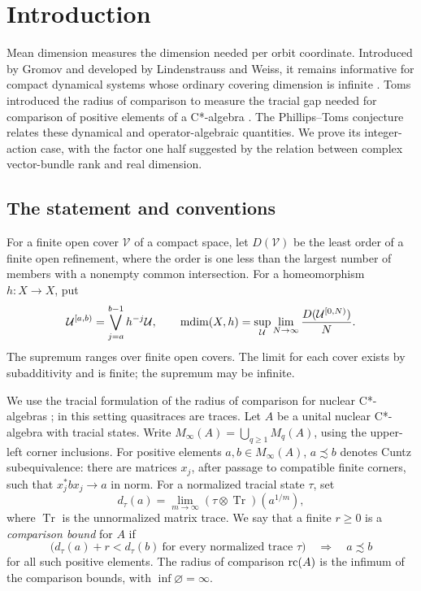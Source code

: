 \section{Introduction}
\label{sec:introduction}

Mean dimension measures the dimension needed per orbit coordinate.
Introduced by Gromov and developed by Lindenstrauss and Weiss, it remains
informative for compact dynamical systems whose ordinary covering
dimension is infinite \cite{Gromov1999,LindenstraussWeiss2000}.
Toms introduced the radius of comparison to measure the tracial gap
needed for comparison of positive elements of a C*-algebra
\cite[Definition~6.1]{Toms2006}. The Phillips--Toms conjecture relates
these dynamical and operator-algebraic quantities. We prove its
integer-action case, with the factor one half suggested by the relation
between complex vector-bundle rank and real dimension.

\subsection{The statement and conventions}

For a finite open cover \(\mathcal V\) of a compact space, let
\(D(\mathcal V)\) be the least order of a finite open refinement, where
the order is one less than the largest number of members with a nonempty
common intersection. For a homeomorphism \(h:X\to X\), put
\[
\mathcal U^{[a,b)}=\bigvee_{j=a}^{b-1}h^{-j}\mathcal U,
\qquad
\operatorname{mdim}(X,h)=\sup_{\mathcal U}
\lim_{N\to\infty}\frac{D(\mathcal U^{[0,N)})}{N}.
\]
The supremum ranges over finite open covers. The limit for each cover
exists by subadditivity and is finite; the supremum may be infinite.

We use the tracial formulation of the radius of comparison for nuclear
C*-algebras \cite[Definition~2.10]{Niu2024}; in this setting quasitraces
are traces. Let \(A\) be a unital nuclear C*-algebra with tracial states. Write
\(M_\infty(A)=\bigcup_{q\ge1}M_q(A)\), using the upper-left corner
inclusions. For positive elements \(a,b\in M_\infty(A)\),
\(a\precsim b\) denotes Cuntz subequivalence: there are matrices
\(x_j\), after passage to compatible finite corners, such that
\(x_j^*bx_j\to a\) in norm. For a normalized tracial state \(\tau\), set
\[
d_\tau(a)=\lim_{m\to\infty}(\tau\otimes\operatorname{Tr})(a^{1/m}),
\]
where \(\operatorname{Tr}\) is the unnormalized matrix trace.
We say that a finite \(r\ge0\) is a \emph{comparison bound} for \(A\) if
\begin{equation}
\label{eq:comparison-bound}
\bigl(d_\tau(a)+r<d_\tau(b)\ \text{for every normalized trace }\tau\bigr)
\quad\Longrightarrow\quad a\precsim b
\end{equation}
for all such positive elements. The radius of comparison \(\operatorname{rc}(A)\)
is the infimum of the comparison bounds, with \(\inf\varnothing=\infty\).

